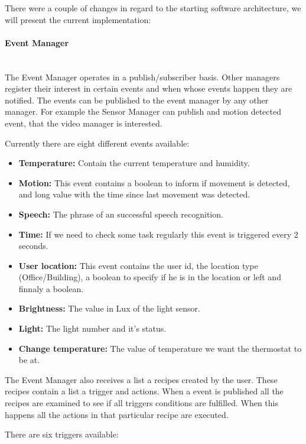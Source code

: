 There were a couple of changes in regard to the starting software architecture, we will present the current implementation:

\paragraph{Event Manager}\mbox{}\\

The Event Manager  operates in a publish/subscriber basis. Other managers register their interest in certain events and when whose events happen they are notified. The events can be published to the event manager by any other manager. For example the Sensor Manager can publish and motion detected event, that the video manager is interested.

Currently there are eight different events available:

\begin{itemize}
  \item \textbf{Temperature:} Contain the current temperature and humidity.
  \item \textbf{Motion:} This event contains a boolean to inform if movement is detected, and long value with the time since last movement was detected.
  \item \textbf{Speech:} The phrase of an successful speech recognition.  
  \item \textbf{Time:} If we need to check some task regularly this event is triggered every 2 seconds.  
  \item \textbf{User location:} This event contains the user id, the location type (Office/Building), a boolean to specify if he is in the location or left and finnaly a boolean.
  \item \textbf{Brightness:} The value in Lux of the light sensor.  
  \item \textbf{Light:} The light number and it's status. 
  \item \textbf{Change temperature:} The value of temperature we want the thermostat to be at. 
  
\end{itemize}


The Event Manager also receives a list a recipes created by the user. These recipes contain a list a trigger and actions. When a event is published all the recipes are examined to see if all triggers conditions are fulfilled. When this happens all the actions in that particular recipe are executed.

There are six triggers available:

